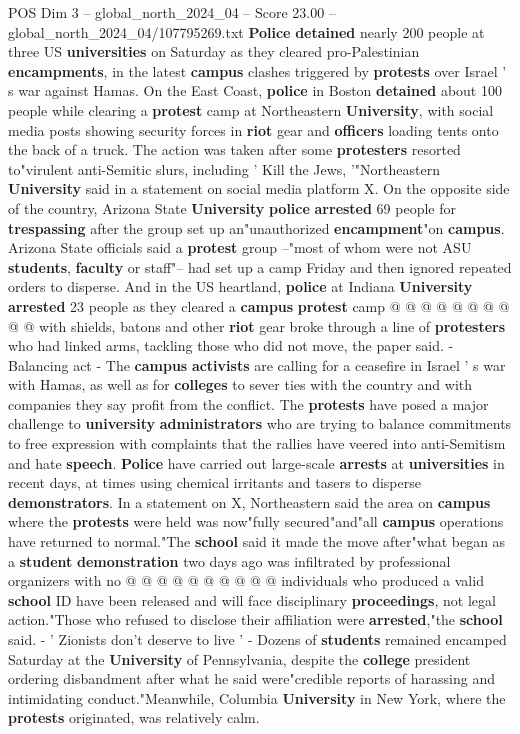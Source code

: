 \begin{textsample}{POS Dim 3 – global\_north\_2024\_04 – Score 23.00 – global\_north\_2024\_04/107795269.txt}  \label{ex:f3_pos_054}
\textbf{Police} \textbf{detained} nearly 200 people at three US \textbf{universities} on Saturday as they cleared pro-Palestinian \textbf{encampments}, in the latest \textbf{campus} clashes triggered by \textbf{protests} over Israel ' s war against Hamas.
On the East Coast, \textbf{police} in Boston \textbf{detained} about 100 people while clearing a \textbf{protest} camp at Northeastern \textbf{University}, with social media posts showing security forces in \textbf{riot} gear and \textbf{officers} loading tents onto the back of a truck.
The action was taken after some \textbf{protesters} resorted to"virulent anti-Semitic slurs, including ' Kill the Jews, '"Northeastern \textbf{University} said in a statement on social media platform X.
On the opposite side of the country, Arizona State \textbf{University} \textbf{police} \textbf{arrested} 69 people for \textbf{trespassing} after the group set up an"unauthorized \textbf{encampment}"on \textbf{campus}.
Arizona State officials said a \textbf{protest} group --"most of whom were not ASU \textbf{students}, \textbf{faculty} or staff"-- had set up a camp Friday and then ignored repeated orders to disperse.
And in the US heartland, \textbf{police} at Indiana \textbf{University} \textbf{arrested} 23 people as they cleared a \textbf{campus} \textbf{protest} camp @ @ @ @ @ @ @ @ @ @ with shields, batons and other \textbf{riot} gear broke through a line of \textbf{protesters} who had linked arms, tackling those who did not move, the paper said. - Balancing act - The \textbf{campus} \textbf{activists} are calling for a ceasefire in Israel ' s war with Hamas, as well as for \textbf{colleges} to sever ties with the country and with companies they say profit from the conflict.
The \textbf{protests} have posed a major challenge to \textbf{university} \textbf{administrators} who are trying to balance commitments to free expression with complaints that the rallies have veered into anti-Semitism and hate \textbf{speech}. \textbf{Police} have carried out large-scale \textbf{arrests} at \textbf{universities} in recent days, at times using chemical irritants and tasers to disperse \textbf{demonstrators}.
In a statement on X, Northeastern said the area on \textbf{campus} where the \textbf{protests} were held was now"fully secured"and"all \textbf{campus} operations have returned to normal."The \textbf{school} said it made the move after"what began as a \textbf{student} \textbf{demonstration} two days ago was infiltrated by professional organizers with no @ @ @ @ @ @ @ @ @ @ individuals who produced a valid \textbf{school} ID have been released and will face disciplinary \textbf{proceedings}, not legal action."Those who refused to disclose their affiliation were \textbf{arrested},"the \textbf{school} said. - ' Zionists don't deserve to live ' - Dozens of \textbf{students} remained encamped Saturday at the \textbf{University} of Pennsylvania, despite the \textbf{college} president ordering disbandment after what he said were"credible reports of harassing and intimidating conduct."Meanwhile, Columbia \textbf{University} in New York, where the \textbf{protests} originated, was relatively calm.

\end{textsample}

